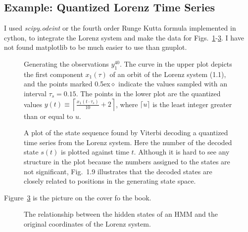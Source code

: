 \documentclass[prelim,showlabels]{book}
\newcommand{\Tsamp}{\tau_s }
\newcommand{\ceil}[1]{\lceil#1\rceil}
\newcommand{\bceil}[1]{\left\lceil#1\right\rceil}
\newcommand{\ti}[2]{{#1}{(#2)}}                  %
\newcommand{\ts}[3]{#1_{#2}^{#3}}                    %
\newcommand{\plotsize}{\small}
\begin{document}
\subsection{Example: Quantized Lorenz Time Series}
\label{sec:QuantizedLorenz}

I used \emph{scipy.odeint} or the fourth order Runge Kutta formula
implemented in cython, to integrate the Lorenz system and make the
data for Figs.~\ref{fig:TSintro}-\ref{fig:Statesintro}.  I have not
found matplotlib to be much easier to use than gnuplot.
\begin{figure}[htbp]
  \centering{
  }
  \caption[Generating the observations $\ts{y}{1}{40}$.]%
  {Generating the observations $\ts{y}{1}{40}$.  The curve in the
    upper plot depicts the first component $\ti{x_1}{\tau}$ of an
    orbit of the Lorenz system (1.1), and the points
    marked {\scriptsize\raise0.5ex\hbox{$\bm{\diamond}\!$}} indicate the
    values sampled with an interval $\Tsamp = 0.15$.  The points
    in the lower plot are the quantized values $\ti{y}{t} \equiv
    \bceil{\frac{\ti{x_1}{t \cdot \Tsamp}}{10} + 2}$, where
    $\ceil{u}$ is the least integer greater than or equal to $u$.  }
  \label{fig:TSintro} 
\end{figure}

 \begin{figure}[htbp]
   \centering{\plotsize%
%     
}
   \caption{A plot of the state sequence found by Viterbi decoding a quantized
     time series from the Lorenz system.  Here the number of the
     decoded state $\ti{s}{t}$ is plotted against time $t$.  Although
     it is hard to see any structure in the plot because the numbers
     assigned to the states are not significant,
     Fig.~1.9 illustrates that the decoded states
     are closely related to positions in the generating state space.}
   \label{fig:STSintro}
 \end{figure}

 Figure~\ref{fig:Statesintro} is the picture on the cover fo the book.
 \begin{figure}[htb]
   \caption[Relationship between states of HMM and Lorenz system.]%
   {The relationship between the hidden states of an HMM and the
     original coordinates of the Lorenz system.}
   \label{fig:Statesintro}
 \end{figure}
\end{document}
